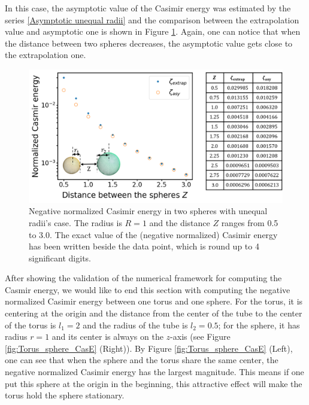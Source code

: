 In this case, the asymptotic value of the Casimir 
energy was estimated by the series \eqref{Asymptotic unequal radii} and the comparison between the extrapolation value and asymptotic one is shown in Figure 
\ref{Casimir energy between spheres with unequal radii}. Again, one can notice that when the distance between two spheres decreases, the asymptotic value gets 
close to the extrapolation one.
\begin{figure}[H]
    \centering
    \includegraphics[width = \textwidth]{figures/Spheres_unequal_CasE.png}
    \caption{Negative normalized Casimir energy in two spheres with unequal radii's case. The radius is $R = 1$ and the distance $Z$ 
    ranges from 0.5 to 3.0. The exact value of the (negative normalized) Casimir energy has been written 
    beside the data point, which is round up to 4 significant digits.}
    \label{Casimir energy between spheres with unequal radii}
\end{figure}

After showing the validation of the numerical framework for computing the Casmir energy, we would like to end this section with computing the negative normalized Casimir energy between one torus and one sphere. For the torus, it is centering at the origin and the distance from the center of the tube to the center of the torus is $l_1 = 2$ and the radius of the tube is $l_2 = 0.5$; for the sphere, 
it has radius $r = 1$ and its center is always on the $z$-axis (see Figure \ref{fig:Torus_sphere_CasE} (Right)). By  Figure \ref{fig:Torus_sphere_CasE} (Left), one can see that when the sphere and the torus share the same center, the negative normalized Casimir energy has the largest magnitude. This means if one put this sphere at the origin in the beginning, this attractive effect will make the torus hold the sphere stationary. 


